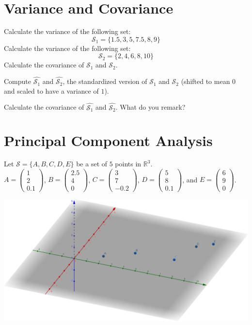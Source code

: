 \documentclass[]{article}
\begin{document}
	\section{Variance and Covariance}
	Calculate the variance of the following set:
	$$
	\mathcal{S}_1 = \{ 1.5, 3, 5, 7.5, 8, 9 \}
	$$
	Calculate the variance of the following set:
	$$
	\mathcal{S}_2 = \{ 2, 4, 6, 8, 10 \}
	$$
	Calculate the covariance of $\mathcal{S}_1$ and $\mathcal{S}_2$.
	
	Compute $\hat{\mathcal{S}_1}$ and $\hat{\mathcal{S}_2}$, the standardized version of $\mathcal{S}_1$ and $\mathcal{S}_2$ (shifted to mean $0$ and scaled to have a variance of $1$).
	
	Calculate the covariance of $\hat{\mathcal{S}_1}$ and $\hat{\mathcal{S}_2}$. What do you remark?

	\section{Principal Component Analysis}
	Let $\mathcal{S} = \{ A, B, C, D, E \}$ be a set of $5$ points in $\mathbb{R}^3$.\\
	$A = \begin{pmatrix} 1 \\ 2 \\ 0.1 \end{pmatrix}$,
	$B = \begin{pmatrix} 2.5 \\ 4 \\ 0 \end{pmatrix}$,
	$C = \begin{pmatrix} 3 \\ 7 \\ -0.2 \end{pmatrix}$,
	$D = \begin{pmatrix} 5 \\ 8 \\ 0.1 \end{pmatrix}$,
	and $E = \begin{pmatrix} 6 \\ 9 \\ 0 \end{pmatrix}$.
	
	\begin{center}
		\vspace{0.2cm}
		\includegraphics[width=0.95\linewidth]{points}
		\vspace{0.2cm}
	\end{center}
	
\end{document}
